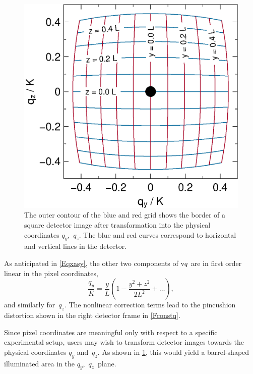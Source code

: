 \begin{figure}[t]
\begin{center}
\includegraphics[width=.47\textwidth]{fig/drawing/SAS_const_p_yz.ps}
\end{center}
\caption{The outer contour of the blue and red grid
shows the border of a square detector image
after transformation into the physical coordinates $q_y$,~$q_z$.
The blue and red curves correspond to horizontal and vertical lines in the detector.}
\label{Fconstp}
\end{figure}

As anticipated in \cref{Eqxasy},
the other two components of $\text{v}{q}$ are in first order linear in the pixel coordinates,
\begin{equation}
  \frac{q_y}{K}=\frac{y}{L}\left(1-\frac{y^2+z^2}{2L^2}+\ldots\right),
\end{equation}
and similarly for~$q_z$.
The nonlinear correction terms lead to the pincushion distortion
shown in the right detector frame in \cref{Fconstq}.
%
%
%

Since pixel coordinates are meaningful only
with respect to a specific experimental setup,
users may wish to transform detector images
towards the physical coordinates $q_y$ and~$q_z$.
As shown in \cref{Fconstp},
this would yield a barrel-shaped illuminated area
in the $q_y$,~$q_z$~plane.



